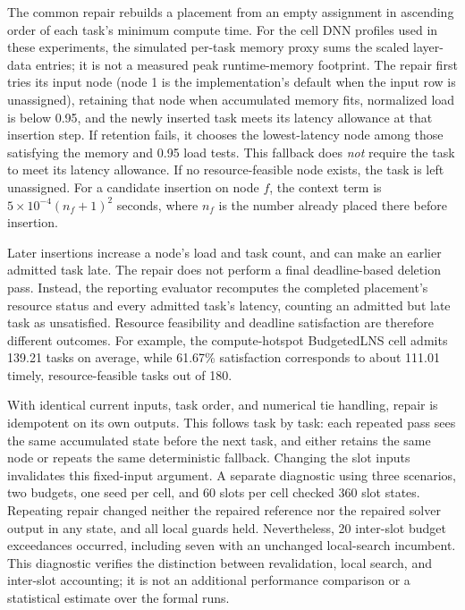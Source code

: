 \documentclass[preprint,12pt]{elsarticle}
\begin{document}
The common repair rebuilds a placement from an empty assignment in
ascending order of each task's minimum compute time. For the cell DNN
profiles used in these experiments, the simulated per-task memory proxy
sums the scaled layer-data entries; it is not a measured peak
runtime-memory footprint. The repair
first tries its input node (node 1 is the implementation's default when
the input row is unassigned), retaining that node when accumulated memory
fits, normalized load is below 0.95, and the newly inserted task meets its
latency allowance at that insertion step. If retention fails, it chooses
the lowest-latency node among those satisfying the memory and 0.95 load
tests. This fallback does \emph{not} require the task to meet its latency
allowance. If no resource-feasible node exists, the task is left
unassigned. For a candidate insertion on node \(f\), the context term is
\(5\times10^{-4}(n_f+1)^2\) seconds, where \(n_f\) is the number
already placed there before insertion.

Later insertions increase a node's load and task count, and can make an
earlier admitted task late. The repair does not perform a final
deadline-based deletion pass. Instead, the reporting evaluator recomputes
the completed placement's resource status and every admitted task's
latency, counting an admitted but late task as unsatisfied. Resource
feasibility and deadline satisfaction are therefore different outcomes.
For example, the compute-hotspot BudgetedLNS cell admits 139.21 tasks on
average, while 61.67\% satisfaction corresponds to about 111.01 timely,
resource-feasible tasks out of 180.

With identical current inputs, task order, and numerical tie handling,
repair is idempotent on its own outputs. This follows task by task: each
repeated pass sees the same accumulated state before the next task, and
either retains the same node or repeats the same deterministic fallback.
Changing the slot inputs invalidates this fixed-input argument. A
separate diagnostic using three scenarios, two budgets, one seed per cell,
and 60 slots per cell checked 360 slot states. Repeating repair changed
neither the repaired reference nor the repaired solver output in any
state, and all local guards held. Nevertheless, 20 inter-slot budget
exceedances occurred, including seven with an unchanged local-search
incumbent. This diagnostic verifies the distinction between revalidation,
local search, and inter-slot accounting; it is not an additional
performance comparison or a statistical estimate over the formal runs.
\end{document}

